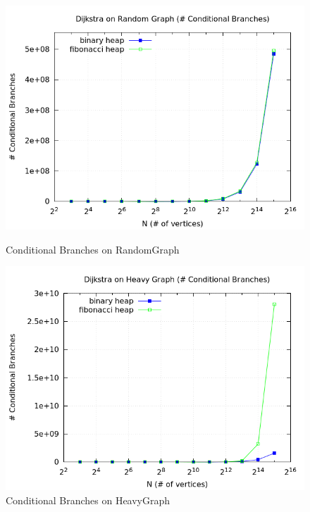 \documentclass[a4paper,oneside,article,11pt]{memoir}
\begin{document}
\begin{figure}[H]
\centering
\begin{minipage}{0.48\columnwidth}
  \centering
  \includegraphics[width=\linewidth]{../res/dijkstra/d_random_br.png}%
  \caption{Conditional Branches on RandomGraph}
  \label{fig:dijkstra_random_br}
\end{minipage}%
\hfill
\begin{minipage}{0.48\columnwidth}
  \centering
  \includegraphics[width=\linewidth]{../res/dijkstra/d_heavy_br.png}%
  \caption{Conditional Branches on HeavyGraph}
  \label{fig:dijkstra_heavy_br}
\end{minipage}
\end{figure}
\end{document}
